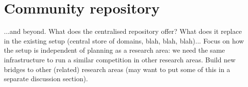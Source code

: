 \section{Community repository}
\label{sec:repository}

...and beyond.
What does the centralised repository offer? What does it replace in the
existing setup (central store of domains, blah, blah, blah)... Focus on how
the setup is independent of planning as a research area: we need the same
infrastructure to run a similar competition in other research areas. Build
new bridges to other (related) research areas (may want to put some of this
in a separate discussion section).


